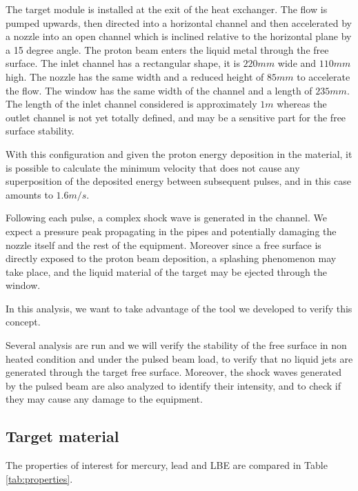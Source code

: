 \documentclass[a4paper, 11pt, twocolumn]{article}
\begin{document}
The target module is installed at the exit of the heat exchanger. The flow is pumped upwards, then directed into a horizontal channel and then accelerated by a nozzle into an open channel which is inclined relative to the horizontal plane by a 15 degree angle. The proton beam enters the liquid metal through the free surface. The inlet channel has a rectangular shape, it is $220 mm$ wide and $110mm$ high. The nozzle has the same width and a reduced height of $85mm$ to accelerate the flow. The window has the same width of the channel and a length of $235mm$. The length of the inlet channel considered is approximately $1m$ whereas the outlet channel is not yet totally defined, and may be a sensitive part for the free surface stability. 

With this configuration and given the proton energy deposition in the material, it is possible to calculate the minimum velocity that does not cause any superposition of the deposited energy between subsequent pulses, and in this case amounts to $1.6m/s$.

Following each pulse, a complex shock wave is generated in the channel. We expect a pressure peak propagating in the pipes and potentially damaging the nozzle itself and the rest of the equipment. Moreover since a free surface is directly exposed to the proton beam deposition, a splashing phenomenon may take place, and the liquid material of the target may be ejected through the window. 

In this analysis, we want to take advantage of the tool we developed to verify this concept.

Several analysis are run and we will verify the stability of the free surface in non heated condition and under the pulsed beam load, to verify that no liquid jets are generated through the target free surface. Moreover, the shock waves generated by the pulsed beam are also analyzed to identify their intensity, and to check if they may cause any damage to the equipment.


\subsection{Target material}
The properties of interest for mercury, lead and LBE are compared in Table \ref{tab:properties}.
\end{document}
